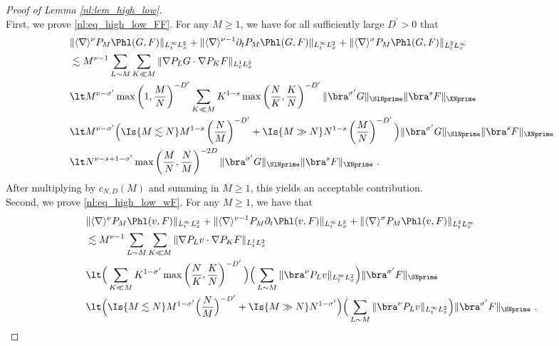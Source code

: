 \documentclass[11pt]{article}
\begin{document}
\begin{proof}[Proof of Lemma \ref{nl:lem_high_low}]~\\
First, we prove \eqref{nl:eq_high_low_FF}. For any \( M \geq 1 \), we have for all sufficiently large \( D^\prime >0 \) that
\begin{align*}
&\| \langle \nabla \rangle^{\nu} P_M \Phl(G,F) \|_{L_t^\infty L_x^2}+\| \langle \nabla \rangle^{\nu-1} \partial_t P_M \Phl(G,F) \|_{L_t^\infty L_x^2}  + \| \langle \nabla \rangle^{\sigma} P_M \Phl(G,F) \|_{L_t^2 L_x^\infty}\\
&\lesssim M^{\nu-1} \sum_{L\sim M} \sum_{K\ll M} \| \nabla P_L G \cdot \nabla P_K F \|_{L_t^1 L_x^2} \\
&\lt M^{\nu-\sigma^\prime} \max \left( 1, \frac{M}{N} \right)^{-D^\prime} \sum_{K \ll M} K^{1-s} \max \left( \frac{N}{K}, \frac{K}{N} \right)^{-D^\prime} \| \bra^{\sigma^\prime} G \|_{\SlNprime} \| \bra^s F \|_{\XNprime} \\
&\lt M^{\nu-\sigma^\prime} \Big( \Is{M\lesssim N} M^{1-s} \left( \frac{N}{M} \right)^{-D^\prime} + \Is{M\gg N} N^{1-s} \left( \frac{M}{N} \right)^{-D^\prime} \Big)\| \bra^{\sigma^\prime} G \|_{\SlNprime} \| \bra^s F \|_{\XNprime}\\
&\lt N^{\nu-s+1-\sigma^\prime} \max \left( \frac{M}{N}, \frac{N}{M} \right)^{-2D} \| \bra^{\sigma^\prime} G \|_{\SlNprime} \| \bra^s F \|_{\XNprime}~. 
\end{align*}
After multiplying by \( c_{N,D}(M) \) and summing in \( M \geq 1 \), this yields an acceptable contribution. \\
Second, we prove \eqref{nl:eq_high_low_wF}. For any \( M \geq 1 \), we have that
\begin{align*}
&\| \langle \nabla \rangle^{\nu} P_M \Phl(v,F) \|_{L_t^\infty L_x^2}+\| \langle \nabla \rangle^{\nu-1}  P_M \partial_t \Phl(v,F) \|_{L_t^\infty L_x^2}  + \| \langle \nabla \rangle^{\sigma} P_M \Phl(v,F) \|_{L_t^2 L_x^\infty}\\
&\lesssim M^{\nu-1} \sum_{L\sim M} \sum_{K\ll M} \| \nabla P_L v \cdot \nabla P_K F \|_{L_t^1 L_x^2} \\
&\lt  \Big( \sum_{K\ll M} K^{1-\sigma^\prime} \max \left( \frac{N}{K} , \frac{K}{N} \right)^{-D^\prime} \Big) \Big(\sum_{L\sim M} \| \bra^\nu P_L v \|_{L_t^\infty L_x^2} \Big) \| \bra^{\sigma^\prime} F \|_{\SNprime} \\
&\lt \Big( \Is{M\lesssim N} M^{1-\sigma^\prime} \Big( \frac{N}{M} \Big)^{-D^\prime} + \Is{M\gg N} N^{1-\sigma^\prime} \Big)\Big(\sum_{L\sim M} \| \bra^\nu P_L v \|_{L_t^\infty L_x^2} \Big) \| \bra^{\sigma^\prime} F \|_{\SNprime} ~. 

\end{align*}
\end{proof}
\end{document}
